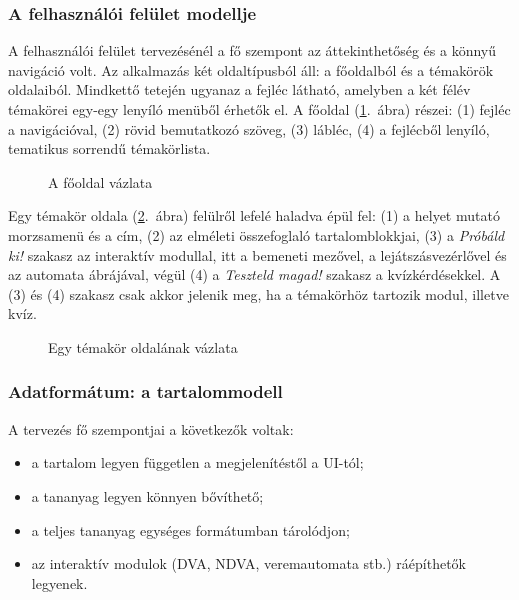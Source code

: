 \subsubsection{A felhasználói felület modellje}
A felhasználói felület tervezésénél a fő szempont az áttekinthetőség
és a könnyű navigáció volt. Az alkalmazás két oldaltípusból áll: a
főoldalból és a témakörök oldalaiból. Mindkettő tetején ugyanaz a
fejléc látható, amelyben a két félév témakörei egy-egy lenyíló
menüből érhetők el.
\clearpage
A főoldal (\ref{fig:homepage}.~ábra) részei: (1) fejléc a
navigációval, (2) rövid bemutatkozó szöveg, (3) lábléc, (4) a
fejlécből lenyíló, tematikus sorrendű témakörlista.

\begin{figure}[htbp]
    \centering
    \resizebox{\textwidth}{!}{}
    \caption{A főoldal vázlata}
    \label{fig:homepage}
\end{figure}

\clearpage

Egy témakör oldala (\ref{fig:module}.~ábra) felülről lefelé haladva
épül fel: (1) a helyet mutató morzsamenü és a cím, (2) az elméleti
összefoglaló tartalomblokkjai, (3) a \emph{Próbáld ki!} szakasz az
interaktív modullal, itt a bemeneti mezővel, a lejátszásvezérlővel és
az automata ábrájával, végül (4) a \emph{Teszteld magad!} szakasz a
kvízkérdésekkel. A (3) és (4) szakasz csak akkor jelenik meg, ha a
témakörhöz tartozik modul, illetve kvíz.

\begin{figure}[H]
    \centering
    \resizebox{!}{0.8\textheight}{}
    \caption{Egy témakör oldalának vázlata}
    \label{fig:module}
\end{figure}

\subsubsection{Adatformátum: a tartalommodell}
\label{sec:data}

A tervezés fő szempontjai a következők voltak:

\begin{itemize}
    \item a tartalom legyen független a megjelenítéstől a UI-tól;
    \item a tananyag legyen könnyen bővíthető;
    \item a teljes tananyag egységes formátumban tárolódjon;
    \item az interaktív modulok (DVA, NDVA, veremautomata stb.)
          ráépíthetők legyenek.
\end{itemize}

